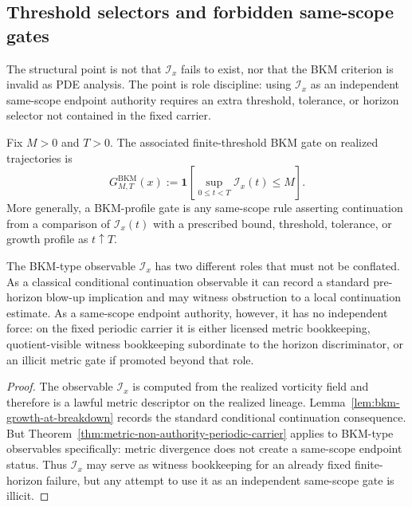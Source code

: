 \subsection{Threshold selectors and forbidden same-scope gates}
The structural point is not that $\mathcal I_x$ fails to exist, nor that the BKM criterion is invalid as PDE analysis. The point is role discipline: using $\mathcal I_x$ as an independent same-scope endpoint authority requires an extra threshold, tolerance, or horizon selector not contained in the fixed carrier.

\begin{definition}\label{def:finite-threshold-bkm-gate}
Fix $M>0$ and $T>0$. The associated finite-threshold BKM gate on realized trajectories is
\[
G^{\mathrm{BKM}}_{M,T}(x):=\mathbf 1\!\left[\sup_{0\le t<T}\mathcal I_x(t)\le M\right].
\]
More generally, a BKM-profile gate is any same-scope rule asserting continuation from a comparison of
$\mathcal I_x(t)$ with a prescribed bound, threshold, tolerance, or growth profile as $t\uparrow T$.
\end{definition}


\begin{manualproposition}
\label{prop:bkm-metric-witness-not-authority}
The BKM-type observable $\mathcal I_x$ has two different roles that must not be conflated. As a classical conditional continuation observable it can record a standard pre-horizon blow-up implication and may witness obstruction to a local continuation estimate. As a same-scope endpoint authority, however, it has no independent force: on the fixed periodic carrier it is either licensed metric bookkeeping, quotient-visible witness bookkeeping subordinate to the horizon discriminator, or an illicit metric gate if promoted beyond that role.
\end{manualproposition}

\begin{proof}
The observable $\mathcal I_x$ is computed from the realized vorticity field and therefore is a lawful metric descriptor on the realized lineage. Lemma~\ref{lem:bkm-growth-at-breakdown} records the standard conditional continuation consequence. But Theorem~\ref{thm:metric-non-authority-periodic-carrier} applies to BKM-type observables specifically: metric divergence does not create a same-scope endpoint status. Thus $\mathcal I_x$ may serve as witness bookkeeping for an already fixed finite-horizon failure, but any attempt to use it as an independent same-scope gate is illicit.
\end{proof}

